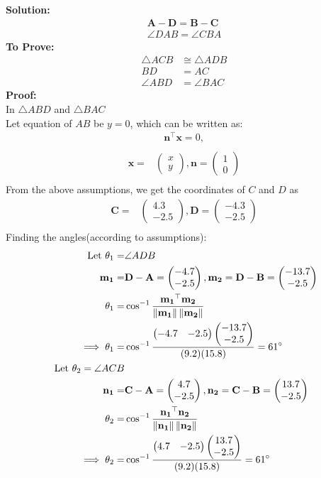 \documentclass{article}
\providecommand{\norm}[1]{\left\lVert#1\right\rVert}
\newcommand{\solution}{\noindent \textbf{Solution: }}
\newcommand{\myvec}[1]{\ensuremath{\begin{pmatrix}#1\end{pmatrix}}}
\let\vec\mathbf
\begin{document}
\solution
\begin{align}
	\vec{A}-\vec{D} = \vec{B}-\vec{C}\\
  \angle{DAB} = \angle{CBA}
\end{align}
\textbf{To Prove:}
  \begin{align}
	  \triangle{ACB} &\cong \triangle{ADB}\\
	  BD &= AC\\
	  \angle{ABD} &= \angle{BAC}
  \end{align}
\textbf{Proof:}\\
In $\triangle{ABD}$ and $\triangle{BAC}$\\
Let  equation of $AB$ be $y = 0$, which can be written as:
\begin{align}
	\vec{n}^{\top}\vec{x} = 0,\\
\end{align}
\begin{align}
\vec{x} =& \myvec{x\\y},\vec{n} = \myvec{1\\0}\\
\end{align}
  From the above assumptions, we get the coordinates of $C$ and $D$ as
  \begin{align}
\vec{C} =& \myvec{4.3\\-2.5},\vec{D} = \myvec{-4.3\\-2.5}\\
  \end{align}
    Finding the angles(according to assumptions):
    \begin{align}
\text{Let }\theta_1=&\angle ADB\\
\vec{m_1}=&\vec{D}-\vec{A}=\myvec{-4.7\\-2.5}, \vec{m_2}=\vec{D}-\vec{B}=\myvec{-13.7\\-2.5}\\
\theta_1=&\cos^{-1}\frac{\vec{m_1}^\top\vec{m_2}}{\norm{\vec{m_1}}\norm{\vec{m_2}}}\\
\implies\theta_1=&\cos^{-1}\frac{\myvec{-4.7&-2.5}\myvec{-13.7\\-2.5}}{(9.2)(15.8)}=61\degree 
\label{eq:1}\\
\text{ Let }\theta_2=\angle ACB\\
\vec{n_1}=&\vec{C}-\vec{A}=\myvec{4.7\\-2.5}, \vec{n_2}=\vec{C}-\vec{B}=\myvec{13.7\\-2.5}\\
\theta_2 =& \cos^{-1}\frac{\vec{n_1}^\top\vec{n_2}}{\norm{\vec{n_1}}\norm{\vec{n_2}}}\\
\implies\theta_2=&\cos^{-1}\frac{\myvec{4.7&-2.5}\myvec{13.7\\-2.5}}{(9.2)(15.8)}=61\degree 
\label{eq:2}
\end{align}
\end{document}
